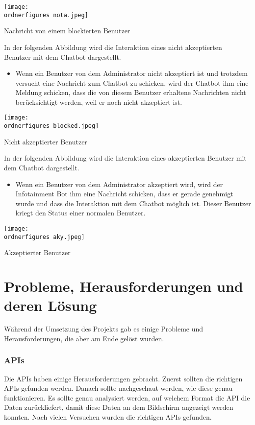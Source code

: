 \begin{center}
	\captionsetup{type=figure}
	\texttt{[image: \\ordnerfigures nota.jpeg]}
	\caption{Nachricht von einem blockierten Benutzer}
	\label{fig:chatbodfsd53}
\end{center}
In der folgenden Abbildung wird die Interaktion eines nicht akzeptierten Benutzer mit dem Chatbot dargestellt.
\begin{itemize}
	\item Wenn ein Benutzer von dem Administrator nicht akzeptiert ist und trotzdem versucht eine Nachricht zum Chatbot zu schicken, wird der Chatbot ihm eine Meldung schicken, dass die von diesem Benutzer erhaltene Nachrichten nicht ber\"ucksichtigt werden, weil er noch nicht akzeptiert ist. 
\end{itemize}
\begin{center}
	\captionsetup{type=figure}
	\texttt{[image: \\ordnerfigures blocked.jpeg]}
	\caption{Nicht akzeptierter Benutzer}
	\label{fig:chatb6dfsd53}
\end{center}
In der folgenden Abbildung wird die Interaktion eines akzeptierten Benutzer mit dem Chatbot dargestellt.
\begin{itemize}
	\item Wenn ein Benutzer von dem Administrator akzeptiert wird, wird der Infotainment Bot ihm eine Nachricht schicken, dass er gerade genehmigt wurde und dass die Interaktion mit dem Chatbot m\"oglich ist. Dieser Benutzer kriegt den Status einer normalen Benutzer.
\end{itemize}
\begin{center}
	\captionsetup{type=figure}
	\texttt{[image: \\ordnerfigures aky.jpeg]}
	\caption{Akzeptierter Benutzer }
	\label{fig:chatbodged53}
\end{center}
\section{Probleme, Herausforderungen und deren Lösung}
Während der Umsetzung des Projekts gab es einige Probleme und Herausforderungen, die aber am Ende gelöst wurden.
\subsubsection{APIs}
Die APIs haben einige Herausforderungen gebracht. Zuerst sollten die richtigen APIs gefunden werden. Danach sollte nachgeschaut werden, wie diese genau funktionieren. Es sollte genau analysiert werden, auf welchem Format die API die Daten zurückliefert, damit diese Daten an dem Bildschirm angezeigt werden konnten. Nach vielen Versuchen wurden die richtigen APIs gefunden.


